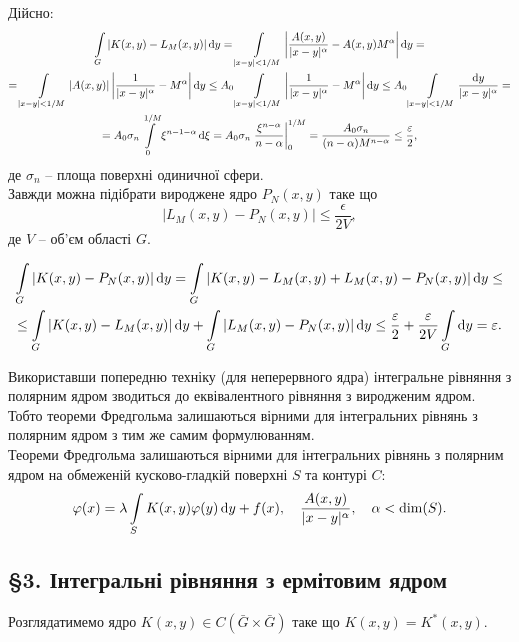 Дійсно:
\begin{multline*} 
	\displaystyle\int\limits_G |K(x, y) - L_M(x, y)| \mathop{}\!\mathrm{d} y = \displaystyle\int\limits_{|x - y| < 1 / M} \left| \dfrac{A(x, y)}{|x - y|^\alpha} - A(x, y) M^\alpha \right| \mathop{}\!\mathrm{d} y = \\
	= \displaystyle\int\limits_{|x - y| < 1 /M} |A(x, y)| \left| \dfrac{1}{|x - y|^\alpha} - M^\alpha \right| \mathop{}\!\mathrm{d} y \le A_0 \displaystyle\int\limits_{|x - y| < 1 /M} \left| \dfrac{1}{|x - y|^\alpha} - M^\alpha \right| \mathop{}\!\mathrm{d} y \le A_0 \displaystyle\int\limits_{|x - y| < 1 /M} \dfrac{\mathop{}\!\mathrm{d} y}{|x - y|^\alpha} = \\
	= A_0 \sigma_n \displaystyle\int\limits_0^{1 / M} \xi^{n - 1 - \alpha} \mathop{}\!\mathrm{d} \xi = A_0 \sigma_n \left.\dfrac{\xi^{n - \alpha}}{n - \alpha}\right|_0^{1 / M} = \dfrac{A_0\sigma_n}{(n - \alpha)M^{n - \alpha}} \le \dfrac{\varepsilon}{2},
\end{multline*}
де $\sigma_n$ -- площа поверхні одиничної сфери. \\

Завжди можна підібрати вироджене ядро $P_N(x, y)$ таке що \[ |L_M(x, y) - P_N(x, y)| \le \dfrac{\epsilon}{2V}, \] де $V$ -- об'єм області $G$. 

\begin{multline*}
	\displaystyle\int\limits_G |K(x, y) - P_N(x, y)| \mathop{}\!\mathrm{d} y = \displaystyle\int\limits_G | K(x, y) - L_M(x, y) + L_M(x, y) - P_N(x, y)| \mathop{}\!\mathrm{d} y \le \\
	\le \displaystyle\int\limits_G | K(x, y) - L_M(x, y)| \mathop{}\!\mathrm{d} y + \displaystyle\int\limits_G |L_M(x, y) - P_N(x, y)| \mathop{}\!\mathrm{d} y \le \dfrac{\varepsilon}{2} + \dfrac{\varepsilon}{2V} \displaystyle\int\limits_G \mathop{}\!\mathrm{d} y = \varepsilon.
\end{multline*}

Використавши попередню техніку (для неперервного ядра) інтегральне рівняння з полярним ядром зводиться до еквівалентного рівняння з виродженим ядром. Тобто теореми Фредгольма залишаються вірними для інтегральних рівнянь з полярним ядром з тим же самим формулюванням. \\

Теореми Фредгольма залишаються вірними для інтегральних рівнянь з полярним ядром на обмеженій кусково-гладкій поверхні $S$ та контурі $C$:
\[ \varphi(x) = \lambda \displaystyle\int\limits_S K(x, y) \varphi(y) \mathop{}\!\mathrm{d} y + f(x), \quad \dfrac{A(x, y)}{|x - y|^\alpha}, \quad \alpha < \dim(S). \]

\subsection*{\S3. Інтегральні рівняння з ермітовим ядром}

Розглядатимемо ядро $K(x, y) \in C(\bar G \times \bar G)$ таке що $K(x, y) = K^*(x, y)$. \\

